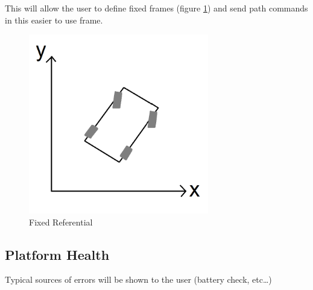 \documentclass{article}
\begin{document}
This will allow the user to define fixed frames (figure \ref{fig:fixedReferential}) and send path commands in this easier to use frame.

 
\begin{figure}[h!]
\centering
\includegraphics[width=0.7\textwidth]{fixedReferential}
\caption{Fixed Referential}
\label{fig:fixedReferential}
\end{figure} 
 

\subsection{Platform Health}

Typical sources of errors will be shown to the user (battery check, etc…)

   
   
\end{document}
